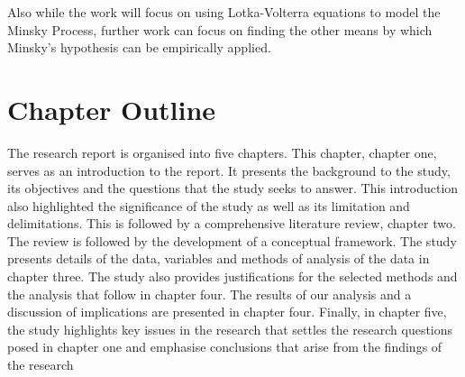 \documentclass[a4paper, 12pt]{article}
\begin{document}
\begin{enumerate}
	Also while the work will focus on using Lotka-Volterra equations to model the Minsky Process, further work can focus on finding the other means by which Minsky's hypothesis can be empirically applied.
	
	\section{Chapter Outline}
	The  research  report  is  organised  into  five  chapters.  This  chapter,  chapter  one,  serves  as  an introduction  to  the  report.  It  presents  the  background  to  the  study,  its  objectives  and  the questions  that the  study  seeks  to  answer.  This  introduction  also  highlighted  the  significance of the study as well as  its  limitation and delimitations. This  is  followed  by a comprehensive literature  review,  chapter  two.  The  review  is  followed  by  the  development  of  a  conceptual framework.  The  study  presents  details  of  the  data,  variables  and  methods  of  analysis  of  the data in chapter three. The study also provides  justifications  for the  selected  methods and the analysis  that  follow  in  chapter  four.  The  results  of  our  analysis  and  a  discussion  of implications  are  presented  in  chapter  four.  Finally,  in  chapter  five,  the  study  highlights  key issues  in the research that settles the research questions posed  in chapter one and emphasise conclusions that arise from the findings of the research
	
	\end{enumerate}
	\newpage
	\singlespacing
		
	
\end{document}
